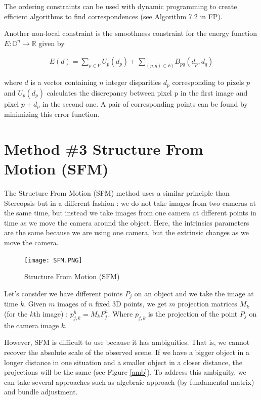 \documentclass[twoside]{article}
\begin{document}
The ordering constraints can be used with dynamic programming to create efficient algorithms to find correspondences (see Algorithm 7.2 in FP). 

Another non-local constraint is the smoothness constraint for the energy function $E:\mathbb{D}^n \rightarrow \mathbb{R}$ given by

\begin{align}
E(d) = \sum_{p \in V} U_p(d_p) + \sum_{(p,q) \in E)} B_{pq}(d_p,d_q)
\end{align}

where $d$ is a vector containing $n$ integer disparities $d_p$ corresponding to pixels $p$ and $U_p(d_p)$ calculates the discrepancy between pixel p in the first image and pixel $p+d_p$ in the second one. A pair of corresponding points can be found by minimizing this error function. 


\newpage
\section{Method \#3 Structure From Motion (SFM)}

The Structure From Motion (SFM) method uses a similar principle than Stereopsis but in a different fashion : we do not take images from two cameras at the same time, but instead we take images from one camera at different points in time as we move the camera around the object. Here, the intrinsics parameters are the same because we are using one camera, but the extrinsic changes as we move the camera.

\begin{figure}[h!]
  \begin{center}
	\texttt{[image: SFM.PNG]}  \end{center}
  \caption{Structure From Motion (SFM)}
  \label{ex}
\end{figure}

Let's consider we have different points $P_j$ on an object and we take the image at time $k$. Given $m$ images of $n$ fixed 3D points, we get $m$ projection matrices $M_k$ (for the $k$th image) : $p_{j,k}^h = M_k P_j^h$.
Where $p_{j,k}$ is the projection of the point $P_j$ on the camera image $k$.

However, SFM is difficult to use because it has ambiguities. That is, we cannot recover the absolute scale of the observed scene. If we have a bigger object in a longer distance in one situation and a smaller object in a closer distance, the projections will be the same (see Figure \ref{amb}). To address this ambiguity, we can take several approaches such as algebraic approach (by fundamental matrix) and bundle adjustment.
\end{document}

